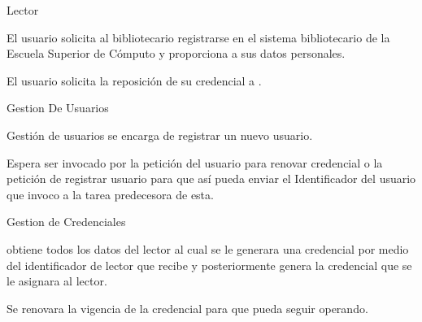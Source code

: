 \begin{PDescripcion}

  \Ppaso Lector

    \begin{enumerate}

      \Ppaso[\itarea]  El usuario solicita al bibliotecario registrarse en el sistema bibliotecario de la Escuela Superior de Cómputo y proporciona a  sus datos personales.

      \Ppaso[\itarea]  El usuario solicita la reposición de su credencial a .

    \end{enumerate}
    
  \Ppaso Gestion De Usuarios

    \begin{enumerate}

      \Ppaso[\itarea]  Gestión de usuarios se encarga de registrar un nuevo usuario.

      \Ppaso[\itarea]  Espera ser invocado por la petición del usuario para renovar credencial o la petición de registrar usuario para que así pueda enviar el Identificador del usuario que invoco a la tarea predecesora de esta.

    \end{enumerate}
    
  \Ppaso Gestion de Credenciales

    \begin{enumerate}

      \Ppaso[\itarea]   obtiene todos los datos del lector al cual se le generara una credencial por medio del identificador de lector que recibe y posteriormente genera la credencial que se le asignara al lector.

      \Ppaso[\itarea]  Se renovara la vigencia de la credencial para que pueda seguir operando.

    \end{enumerate}

\end{PDescripcion}
